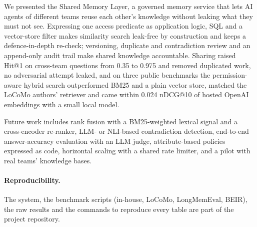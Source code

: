 \documentclass[11pt,a4paper]{article}
\begin{document}
We presented the Shared Memory Layer, a governed memory service that lets AI agents of different teams reuse
each other's knowledge without leaking what they must not see. Expressing one access predicate as application
logic, SQL and a vector-store filter makes similarity search leak-free by construction and keeps a
defence-in-depth re-check; versioning, duplicate and contradiction review and an append-only audit trail make
shared knowledge accountable. Sharing raised Hit@1 on cross-team questions from 0.35 to 0.975 and removed
duplicated work, no adversarial attempt leaked, and on three public benchmarks the permission-aware hybrid
search outperformed BM25 and a plain vector store, matched the LoCoMo authors' retriever and came within
0.024 nDCG@10 of hosted OpenAI embeddings with a small local model.

Future work includes rank fusion with a BM25-weighted lexical signal and a cross-encoder re-ranker,
LLM- or NLI-based contradiction detection, end-to-end answer-accuracy evaluation with an LLM judge,
attribute-based policies expressed as code, horizontal scaling with a shared rate limiter, and a pilot with
real teams' knowledge bases.

\paragraph{Reproducibility.} The system, the benchmark scripts (in-house, LoCoMo, LongMemEval, BEIR), the raw
results and the commands to reproduce every table are part of the project repository.



\end{document}
